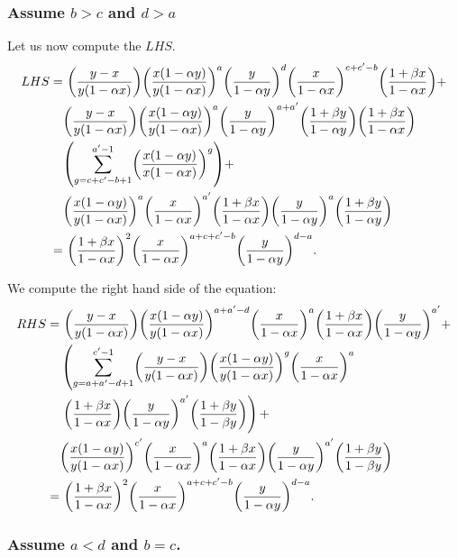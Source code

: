 \documentclass[ALCO, Unicode]{cedram}
\DeclarePairedDelimiter\autobracket{(}{)}
\newcommand{\br}[1]{\autobracket*{#1}}
\begin{document}
\subsubsection{Assume \texorpdfstring{$b>c$ and $d>a$}{b>c and d>a}}
\label{colGcase1}
Let us now compute the $LHS$.
{\allowdisplaybreaks
\begin{align*}
   LHS=&\text{ } \br{\dfrac{y-x}{y(1-\alpha x)}} \br{\dfrac{x(1-\alpha y)}{y(1-\alpha x)}}^{a} \br{\dfrac{y}{1-\alpha y}}^{d} \br{\dfrac{x}{1-\alpha x}}^{c+c'-b}\br{\dfrac{1+\beta x}{1-\alpha x}}+\\
    &\br{\dfrac{y-x}{y(1-\alpha x)}} \br{\dfrac{x(1-\alpha y)}{y(1-\alpha x)}}^{a} \br{\dfrac{y}{1-\alpha y}}^{a+a'}\br{\dfrac{1+\beta y}{1-\alpha y}}\br{\dfrac{1+\beta x}{1-\alpha x}}\\
   & \br{\sum^{a'-1}_{g=c+c'-b+1} \br{\dfrac{x(1-\alpha y)}{x(1-\alpha x)}}^{g}}+\\
   &\br{\dfrac{x(1-\alpha y)}{y(1-\alpha x)}}^{a} \br{\dfrac{x}{1-\alpha x}}^{a'}\br{\dfrac{1+\beta x}{1-\alpha x}} \br{\dfrac{y}{1-\alpha y}}^{a}\br{\dfrac{1+\beta y}{1-\alpha y}}\\
   =& \text{ }\br{\dfrac{1+\beta x}{1-\alpha x}}^2 \br{\dfrac{x}{1-\alpha x}}^{a+c+c'-b}\br{\dfrac{y}{1-\alpha y}}^{d-a}.
\end{align*}
}


We compute the right hand side of the equation:
{
\allowdisplaybreaks
\begin{align*}
RHS=    &\text{ } \br{\dfrac{y-x}{y(1-\alpha x)}} \br{\dfrac{x(1-\alpha   y)}{y(1-\alpha x)}}^{a+a'-d} \br{\dfrac{x}{1-\alpha x}}^{a}\br{\dfrac{1+\beta x}{1-\alpha x}} \br{\dfrac{y}{1-\alpha y}}^{a'}+\\
        &\left( \sum^{c'-1}_{g=a+a'-d+1}  \br{\dfrac{y-x}{y(1-\alpha x)}} \br{\dfrac{x(1-\alpha y)}{y(1-\alpha x)}}^{g} \br{\dfrac{x}{1-\alpha x}}^{a}\right.\\
        &\left.\br{\dfrac{1+\beta x}{1-\alpha x}} \br{\dfrac{y}{1-\alpha y}}^{a'} \br{\dfrac{1+\beta y}{1-\beta y}}\right)+\\
        &    \br{\dfrac{x(1-\alpha y)}{y(1-\alpha x)}}^{c'} \br{\dfrac{x}{1-\alpha x}}^{a}\br{\dfrac{1+\beta x}{1-\alpha x}} \br{\dfrac{y}{1-\alpha y}}^{a'} \br{\dfrac{1+\beta y}{1-\beta y}}\\
       =& \text{ } \br{\dfrac{1+\beta x}{1-\alpha x}}^2 \br{\dfrac{x}{1-\alpha x}}^{a+c+c'-b} \br{\dfrac{y}{1-\alpha y}}^{d-a}.
\end{align*}
}


\subsubsection{Assume \texorpdfstring{$a<d$ and $b=c$}{a<d and b=c}.}
\label{colGcase2}
\end{document}
